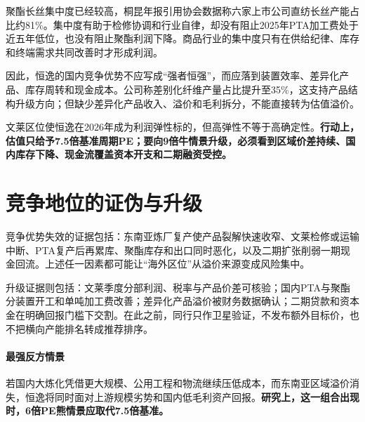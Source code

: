 聚酯长丝集中度已经较高，桐昆年报引用协会数据称六家上市公司直纺长丝产能占比约81\%。集中度有助于检修协调和行业自律，却没有阻止2025年PTA加工费处于近五年低位，也没有阻止聚酯利润下降。商品行业的集中度只有在供给纪律、库存和终端需求共同改善时才形成利润。

因此，恒逸的国内竞争优势不应写成“强者恒强”，而应落到装置效率、差异化产品、库存周转和现金成本。公司称差别化纤维产量占比提升至35\%，这支持产品结构升级方向；但缺少差异化产品收入、溢价和毛利拆分，不能直接转为估值溢价。

\begin{keyinsight}
文莱区位使恒逸在2026年成为利润弹性标的，但高弹性不等于高确定性。\textbf{行动上，估值只给予7.5倍基准周期PE；要向9倍牛情景升级，必须看到区域价差持续、国内库存下降、现金流覆盖资本开支和二期融资受控。}
\end{keyinsight}

\section{竞争地位的证伪与升级}

竞争优势失效的证据包括：东南亚炼厂复产使产品裂解快速收窄、文莱检修或运输中断、PTA复产后再累库、聚酯库存和出口同时恶化，以及二期扩张削弱一期现金回流。上述任一因素都可能让“海外区位”从溢价来源变成风险集中。

升级证据则包括：文莱季度分部利润、税率与产品价差可核验；国内PTA与聚酯分装置开工和单吨加工费改善；差异化产品溢价被财务数据确认；二期贷款和资本金在明确回报门槛下交割。在此之前，同行只作卫星验证，不发布额外目标价，也不把横向产能排名转成推荐排序。

\paragraph{最强反方情景} 若国内大炼化凭借更大规模、公用工程和物流继续压低成本，而东南亚区域溢价消失，恒逸将同时面对上游规模劣势和国内低毛利资产回报。\textbf{研究上，这一组合出现时，6倍PE熊情景应取代7.5倍基准。}
